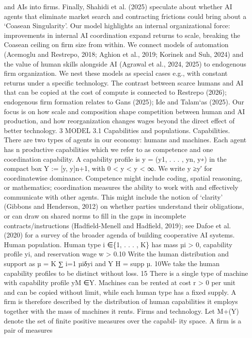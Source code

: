 and AIs into firms. Finally, Shahidi et al. (2025) speculate about whether AI agents
that eliminate market search and contracting frictions could bring about a ‘Coasean
Singularity’. Our model highlights an internal organizational force: improvements in
internal AI coordination expand returns to scale, breaking the Coasean ceiling on firm
size from within.
We connect models of automation (Acemoglu and Restrepo, 2018; Aghion et al., 2019;
Korinek and Suh, 2024) and the value of human skills alongside AI (Agrawal et al.,
2024, 2025) to endogenous firm organization. We nest these models as special cases
e.g., with constant returns under a specific technology. The contrast between scarce
humans and AI that can be copied at the cost of compute is connected to Restrepo
(2026); endogenous firm formation relates to Gans (2025); Ide and Talam`as (2025). Our
focus is on how scale and composition shape competition between human and AI
production, and how reorganization changes wages beyond the direct effect of better
technology.
3 MODEL
3.1 Capabilities and populations.
Capabilities. There are two types of agents in our economy: humans and machines.
Each agent has n productive capabilities which we refer to as competence and one
coordination capability. A capability profile is y = (y1, . . . , yn, y∗) in the compact box
Y := [y, y]n+1, with 0 < y < y < ∞. We write y ≥y′ for coordinatewise dominance.
Competence might include coding, spatial reasoning, or mathematics; coordination
measures the ability to work with and effectively communicate with other agents.
This might include the notion of ‘clarity’ (Gibbons and Henderson, 2012) on whether
parties understand their obligations, or can draw on shared norms to fill in the gaps in
incomplete contracts/instructions (Hadfield-Menell and Hadfield, 2019); see Dafoe
et al. (2020) for a survey of the broader agenda of building cooperative AI systems.
Human population. Human type i ∈\{1, . . . , K\} has mass µi > 0, capability profile yi,
and reservation wage w > 0.10 Write the human distribution and support as
µ =
K
∑
i=1
µiδyi
and
Y H = supp µ.
10We take the human capability profiles to be distinct without loss.
15
There is a single type of machine with capability profile yM ∈Y. Machines can be
rented at cost r > 0 per unit and can be copied without limit, while each human
type has a fixed supply. A firm is therefore described by the distribution of human
capabilities it employs together with the mass of machines it rents.
Firms and technology. Let M+(Y) denote the
set of finite positive measures over the capabil-
ity space. A firm is a pair of measures
